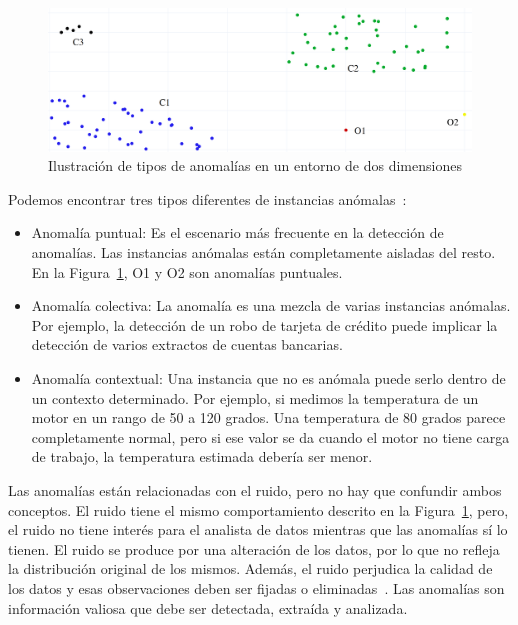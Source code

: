 \documentclass{article}
\begin{document}
	\begin{figure}[htb!]
		\centering
		\includegraphics[scale=0.13]{../figures/anomalies.png}
		\caption{Ilustración de tipos de anomalías en un entorno de dos dimensiones}
		\label{fig:anomalias}
	\end{figure}
	
	Podemos encontrar tres tipos diferentes de instancias anómalas~\cite{goldstein2016comparative}:
	
	\begin{itemize}
		\item Anomalía puntual: Es el escenario más frecuente en la detección de anomalías. Las instancias anómalas están completamente aisladas del resto. En la Figura~\ref{fig:anomalias}, O1 y O2 son anomalías puntuales.
		
		\item Anomalía colectiva: La anomalía es una mezcla de varias instancias anómalas. Por ejemplo, la detección de un robo de tarjeta de crédito puede implicar la detección de varios extractos de cuentas bancarias.
		
		\item Anomalía contextual: Una instancia que no es anómala puede serlo dentro de un contexto determinado. Por ejemplo, si medimos la temperatura de un motor en un rango de 50 a 120 grados. Una temperatura de 80 grados parece completamente normal, pero si ese valor se da cuando el motor no tiene carga de trabajo, la temperatura estimada debería ser menor.
	\end{itemize}
	
	Las anomalías están relacionadas con el ruido, pero no hay que confundir ambos conceptos. El ruido tiene el mismo comportamiento descrito en la Figura~\ref{fig:anomalias}, pero, el ruido no tiene interés para el analista de datos mientras que las anomalías sí lo tienen. El ruido se produce por una alteración de los datos, por lo que no refleja la distribución original de los mismos. Además, el ruido perjudica la calidad de los datos y esas observaciones deben ser fijadas o eliminadas~\cite{LibroBigData, GARCIAGIL2019135, garciagilipf}. Las anomalías son información valiosa que debe ser detectada, extraída y analizada.
\end{document}
